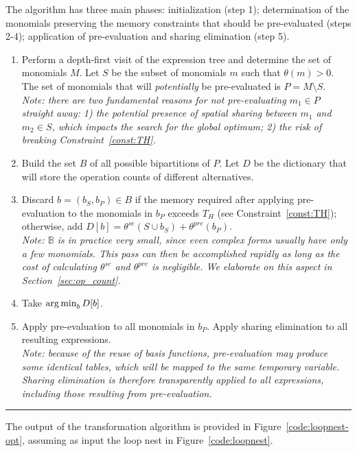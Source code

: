 \begin{Algo}
\label{algo:gamma}
\normalfont
The algorithm has three main phases: initialization (step 1); determination of the monomials preserving the memory constraints that should be pre-evaluated (steps 2-4); application of pre-evaluation and sharing elimination (step 5).
\begin{enumerate}
\item Perform a depth-first visit of the expression tree and determine the set of monomials $M$. Let $S$ be the subset of monomials $m$ such that $\theta(m) > 0$. The set of monomials that will \textit{potentially} be pre-evaluated is $P = M \setminus S$. \\ \textit{Note: there are two fundamental reasons for not pre-evaluating $m_1 \in P$ straight away: 1) the potential presence of spatial sharing between $m_1$ and $m_2 \in S$, which impacts the search for the global optimum; 2) the risk of breaking Constraint~\ref{const:TH}.}
\item Build the set $B$ of all possible bipartitions of $P$. Let $D$ be the dictionary that will store the operation counts of different alternatives.
\item Discard $b = (b_S, b_P) \in B$ if the memory required after applying pre-evaluation to the monomials in $b_P$ exceeds $T_H$ (see Constraint~\ref{const:TH}); otherwise, add $D[b] = \theta^{se}(S \cup b_S) + \theta^{pre}(b_P)$. \\ \textit{Note: $\mathbb{B}$ is in practice very small, since even complex forms usually have only a few monomials. This pass can then be accomplished rapidly as long as the cost of calculating $\theta^{se}$ and $\theta^{pre}$ is negligible. We elaborate on this aspect in Section~\ref{sec:op_count}.}
\item Take $\operatorname*{arg\,min}_b D[b]$.
\item Apply pre-evaluation to all monomials in $b_P$. Apply sharing elimination to all resulting expressions. \\ \textit{Note: because of the reuse of basis functions, pre-evaluation may produce some identical tables, which will be mapped to the same temporary variable. Sharing elimination is therefore transparently applied to all expressions, including those resulting from pre-evaluation.}
\end{enumerate}
\end{Algo}

\noindent\rule[1.0ex]{\linewidth}{0.7pt}

The output of the transformation algorithm is provided in Figure~\ref{code:loopnest-opt}, assuming as input the loop nest in Figure~\ref{code:loopnest}. 

